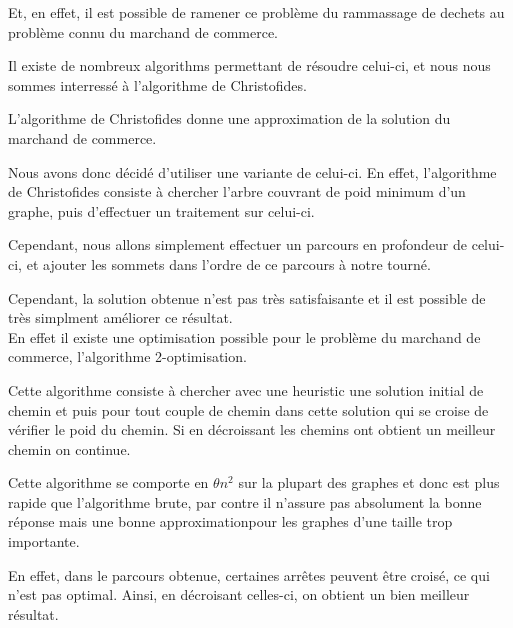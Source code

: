 \documentclass{report}
\begin{document}
  Et, en effet, il est possible de ramener ce problème du rammassage de dechets au problème connu du marchand de commerce.

  Il existe de nombreux algorithms permettant de résoudre celui-ci, et nous nous sommes interressé à l'algorithme de Christofides.
  
  L'algorithme de Christofides donne une approximation de la solution du marchand de commerce.

  Nous avons donc décidé d'utiliser une variante de celui-ci. En effet, l'algorithme de Christofides consiste à chercher l'arbre couvrant de poid minimum d'un graphe, puis d'effectuer un traitement sur celui-ci.


  Cependant, nous allons simplement effectuer un parcours en profondeur de celui-ci, et ajouter les sommets dans l'ordre de ce parcours à notre tourné.


  Cependant, la solution obtenue n'est pas très satisfaisante et il est possible de très simplment améliorer ce résultat. \\ 

  En effet il existe une optimisation possible pour le problème du marchand de commerce, l'algorithme 2-optimisation.

  Cette algorithme consiste à chercher avec une heuristic une solution initial de chemin et puis pour tout couple de chemin dans cette solution qui se croise de vérifier le poid du chemin. Si en décroissant les chemins ont obtient un meilleur chemin on continue.

  Cette algorithme se comporte en $\theta n^2$ sur la plupart des graphes et donc est plus rapide que l'algorithme brute, par contre il n'assure pas absolument la bonne réponse mais une bonne approximationpour les graphes d'une taille trop importante. 

  En effet, dans le parcours obtenue, certaines arrêtes peuvent être croisé, ce qui n'est pas optimal. Ainsi, en décroisant celles-ci, on obtient un bien meilleur résultat.
\end{document}
